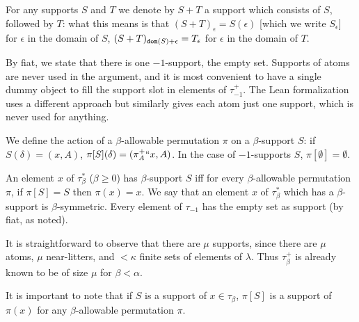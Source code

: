 \documentclass[112pt]{article}
\begin{document}
\begin{description}
\begin{comment}
For any supports $S$ and $T$ we denote by $S+T$ a support which consists
of $S$, followed by $T$, followed by the atoms which need to be added to make this a support (to make it satisfy the additional condition):  what this means is that $(S+T)_\epsilon = S(\epsilon)$ [which we write $S_\epsilon$] for $\epsilon$ in the domain of $S$, $(S+T)_{{\tt dom}(S)+\epsilon} = T_\epsilon$ for $\epsilon$ in the domain of $T$, and the rest of the range of $S+T$ consists of the support conditions with atomic first component  which must be added to satisfy the additional condition [this is not uniquely determined:  supports usually have many possible sums because the needed additional conditions can be added in any order.]
\end{comment}

For any supports $S$ and $T$ we denote by $S+T$ a support which consists
of $S$, followed by $T$:  what this means is that $(S+T)_\epsilon = S(\epsilon)$ [which we write $S_\epsilon$] for $\epsilon$ in the domain of $S$, $(S+T)_{{\tt dom}(S)+\epsilon} = T_\epsilon$ for $\epsilon$ in the domain of $T$.

By fiat, we state that there is one $-1$-support, the empty set.   Supports of atoms are never used in the argument, and it is most convenient to have a single dummy object to fill the support slot in elements of
$\tau_{-1}^+$.  The Lean formalization uses a different approach but similarly gives each atom just one support, which is never used for anything.

We define the action of a $\beta$-allowable permutation $\pi$ on a $\beta$-support $S$:  if $S(\delta) = (x,A)$, $\pi[S](\delta) = (\pi^+_A``x,A)$.  In the case of $-1$-supports $S$, $\pi[\emptyset]=\emptyset$.   

An element $x$ of $\tau^*_\beta$ ($\beta \geq 0$) has $\beta$-support $S$ iff for every $\beta$-allowable permutation $\pi$, if $\pi[S] = S$ then $\pi(x)=x$.  We say that  an element $x$ of $\tau^*_\beta$ which has a $\beta$-support is $\beta$-symmetric. Every element of $\tau_{-1}$ has the empty set as support (by fiat, as noted).

It is straightforward to observe that there are $\mu$ supports, since there are $\mu$ atoms, $\mu$ near-litters, and
$<\kappa$ finite sets of elements of $\lambda$.  Thus $\tau_\beta^+$ is already known to be of size $\mu$ for $\beta<\alpha$.

It is important to note that if $S$ is a support of $x\in \tau_\beta$, $\pi[S]$ is a support of $\pi(x)$ for any $\beta$-allowable permutation $\pi$.


\end{description}
\end{document}
